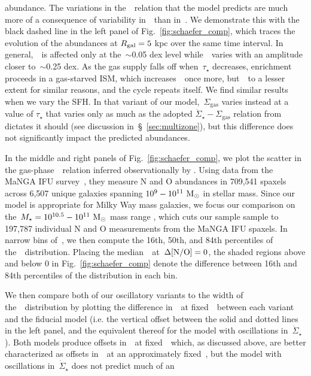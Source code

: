 \documentclass[ms.tex]{subfiles}
\begin{document}
abundance.
The variations in the~\ohno~relation that the model predicts are much more of a
consequence of variability in~\oh~than in~\no.
We demonstrate this with the black dashed line in the left panel of
Fig.~\ref{fig:schaefer_comp}, which traces the evolution of the abundances at
$R_\text{gal} = 5$ kpc over the same time interval.
In general,~\no~is affected only at the~$\sim$0.05 dex level while~\oh~varies
with an amplitude closer to~$\sim$0.25 dex.
As the gas supply falls off when~$\tau_\star$ decreases, enrichment proceeds
in a gas-starved ISM, which increases~\oh~once more, but~\no~to a lesser
extent for similar reasons, and the cycle repeats itself.
We find similar results when we vary the SFH.
In that variant of our model,~$\Sigma_\text{gas}$ varies instead at a value of
$\tau_\star$ that varies only as much as the adopted
$\dot{\Sigma}_\star - \Sigma_\text{gas}$ relation from~\citet{Johnson2021}
dictates it should (see discussion in~\S~\ref{sec:multizone}), but this
difference does not significantly impact the predicted abundances.
\par
In the middle and right panels of Fig.~\ref{fig:schaefer_comp}, we plot the
scatter in the gas-phase~\ohno~relation inferred observationally by
\citet{Schaefer2020}.
Using data from the MaNGA IFU survey~\citep{Bundy2015}, they measure N and O
abundances in 709,541 spaxels across 6,507 unique galaxies spanning
$10^9 - 10^{11}~\text{M}_\odot$ in stellar mass.
Since our model is appropriate for Milky Way mass galaxies, we focus our
comparison on the~$M_\star = 10^{10.5} - 10^{11}~\text{M}_\odot$ mass range
\citep{Licquia2015}, which cuts our sample sample to 197,787 individual N and O
measurements from the MaNGA IFU spaxels.
In narrow bins of~\oh, we then compute the 16th, 50th, and 84th percentiles of
the~\no~distribution.
Placing the median~\no~at~$\Delta\text{[N/O]} = 0$, the shaded regions above and below
0 in Fig.~\ref{fig:schaefer_comp} denote the difference between 16th and 84th
percentiles of the distribution in each bin.
\par
We then compare both of our oscillatory variants to the width of
the~\no~distribution by plotting the difference in~\no~at fixed~\oh~between
each variant and the fiducial model (i.e. the vertical offset between the solid
and dotted lines in the left panel, and the equivalent thereof for the model
with oscillations in~$\dot{\Sigma}_\star$).
Both models produce offsets in~\no~at fixed~\oh~which, as discussed above, are
better characterized as offsets in~\oh~at an approximately fixed~\no, but the
model with oscillations in~$\dot{\Sigma}_\star$ does not predict much of an
\end{document}
